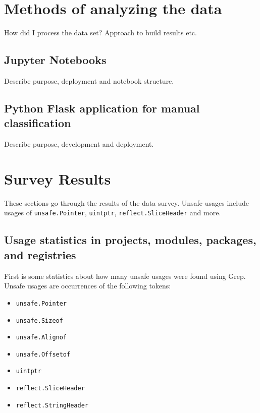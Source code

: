 \section{Methods of analyzing the data}\label{sec:survey-analysis-methods}

How did I process the data set?
Approach to build results etc.



\subsection{Jupyter Notebooks}\label{subsec:survey-jupyter}

Describe purpose, deployment and notebook structure.



\subsection{Python Flask application for manual classification}\label{subsec:survey-classification}

Describe purpose, development and deployment.



\section{Survey Results}\label{sec:survey-results}

These sections go through the results of the data survey.
Unsafe usages include usages of \texttt{unsafe.Pointer}, \texttt{uintptr}, \texttt{reflect.SliceHeader} and more.



\subsection{Usage statistics in projects, modules, packages, and registries}\label{subsec:results-stats}

First is some statistics about how many unsafe usages were found using Grep.
Unsafe usages are occurrences of the following tokens:

\begin{itemize}
    \item \texttt{unsafe.Pointer}
    \item \texttt{unsafe.Sizeof}
    \item \texttt{unsafe.Alignof}
    \item \texttt{unsafe.Offsetof}
    \item \texttt{uintptr}
    \item \texttt{reflect.SliceHeader}
    \item \texttt{reflect.StringHeader}
\end{itemize}

